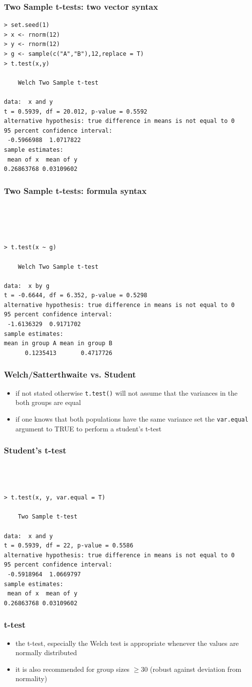 \documentclass[xcolor={table}]{beamer}
\begin{document}
\begin{frame}[fragile]\frametitle{Two Sample t-tests: two vector syntax}\footnotesize
\begin{verbatim}
> set.seed(1)
> x <- rnorm(12)
> y <- rnorm(12)
> g <- sample(c("A","B"),12,replace = T)
> t.test(x,y)

	Welch Two Sample t-test

data:  x and y
t = 0.5939, df = 20.012, p-value = 0.5592
alternative hypothesis: true difference in means is not equal to 0
95 percent confidence interval:
 -0.5966988  1.0717822
sample estimates:
 mean of x  mean of y 
0.26863768 0.03109602   
\end{verbatim}
\end{frame}


\begin{frame}[fragile]\frametitle{Two Sample t-tests: formula syntax}\footnotesize
\begin{verbatim}




> t.test(x ~ g)

	Welch Two Sample t-test

data:  x by g
t = -0.6644, df = 6.352, p-value = 0.5298
alternative hypothesis: true difference in means is not equal to 0
95 percent confidence interval:
 -1.6136329  0.9171702
sample estimates:
mean in group A mean in group B 
      0.1235413       0.4717726 
\end{verbatim}
\end{frame}


\begin{frame}[fragile]\frametitle{Welch/Satterthwaite vs. Student}
  \begin{itemize}
  \item if not stated otherwise \texttt{t.test()} will not assume that the variances in the both groups are equal
  \item if one knows that both populations have the same variance set the \texttt{var.equal} argument to TRUE to perform a student's t-test
  \end{itemize}
\end{frame}

\begin{frame}[fragile]\frametitle{Student's t-test}
\begin{verbatim}



> t.test(x, y, var.equal = T)

	Two Sample t-test

data:  x and y
t = 0.5939, df = 22, p-value = 0.5586
alternative hypothesis: true difference in means is not equal to 0
95 percent confidence interval:
 -0.5918964  1.0669797
sample estimates:
 mean of x  mean of y 
0.26863768 0.03109602   
\end{verbatim}
\end{frame}

\begin{frame}[fragile]\frametitle{t-test}
  \begin{itemize}
  \item the t-test, especially the Welch test is appropriate whenever the values are normally distributed
  \item it is also recommended for group sizes $\geq 30$ (robust against deviation from normality)
  \end{itemize}
\end{frame}
\end{document}

